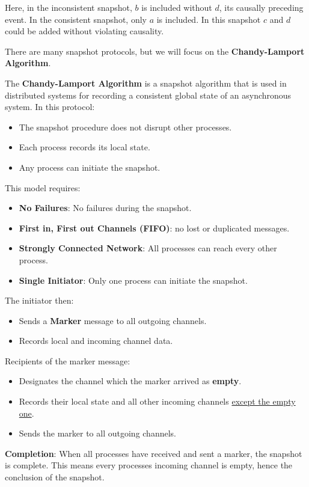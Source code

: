 \noindent 
Here, in the inconsistent snapshot, $b$ is included without $d$, its causally preceding event. In the consistent snapshot, only $a$ is 
included. In this snapshot $c$ and $d$ could be added without violating causality.

\newpage 

\noindent 
There are many snapshot protocols, but we will focus on the \textbf{Chandy-Lamport Algorithm}.
\begin{Def}

    The \textbf{Chandy-Lamport Algorithm} is a snapshot algorithm that is used in distributed systems for
    recording a consistent global state of an asynchronous system. In this protocol:
    \begin{itemize}
        \item The snapshot procedure does not disrupt other processes.
        \item Each process records its local state.
        \item Any process can initiate the snapshot.
    \end{itemize}
    \noindent
    This model requires: 
    \begin{itemize}
        \item \textbf{No Failures}: No failures during the snapshot.
        \item \textbf{First in, First out Channels (FIFO)}: no lost or duplicated messages.
        \item \textbf{Strongly Connected Network}: All processes can reach every other process.
        \item \textbf{Single Initiator}: Only one process can initiate the snapshot.
    \end{itemize}
    
    \noindent 
    The initiator then:
    \begin{itemize}
        \item Sends a \textbf{Marker} message to all outgoing channels.
        \item Records local and incoming channel data.
    \end{itemize}
    Recipients of the marker message:
    \begin{itemize}
        \item Designates the channel which the marker arrived as \textbf{empty}.
        \item Records their local state and all other incoming channels \underline{except the empty one}.
        \item Sends the marker to all outgoing channels.
    \end{itemize}
    \noindent
    \textbf{Completion}: When all processes have received and sent a marker, the snapshot is complete. This 
    means every processes incoming channel is empty, hence the conclusion of the snapshot.


\end{Def}
